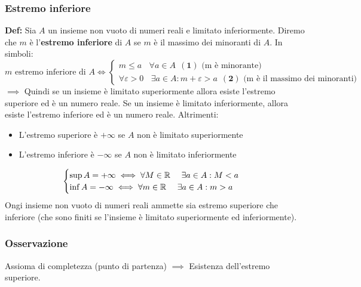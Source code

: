 \documentclass[../../main.tex]{subfiles}
\begin{document}
\subsubsection{Estremo inferiore}
\textbf{Def:} Sia $A$ un insieme non vuoto di numeri reali e limitato inferiormente. Diremo che $m$ è l'\textbf{estremo inferiore} di $A$ se $m$ è il massimo dei minoranti di $A$. In simboli:
\[
    m \text{ estremo inferiore di } A \iff \begin{cases}
        m \leq a  \ \ \ \ \forall a \in A \ \ (\textbf{1}) \text{ (m è minorante)} \\
        \forall \varepsilon > 0 \ \ \ \ \exists a \in A : m + \varepsilon > a \ \ (\textbf{2}) \text{ (m è il massimo dei minoranti)}
    \end{cases}
\]
$\implies$ Quindi se un insieme è limitato superiormente allora esiste l'estremo superiore ed è un numero reale. Se un insieme è limitato inferiormente, allora esiste l'estremo inferiore ed è un numero reale.
Altrimenti:
\begin{itemize}
    \item L'estremo superiore è $+\infty$ se $A$ non è limitato superiormente
    \item L'estremo inferiore è $-\infty$ se $A$ non è limitato inferiormente
\end{itemize}
\[
    \begin{cases}
        \sup A = +\infty \iff \forall M \in \mathbb{R} \ \ \ \ \exists a \in A : M < a \\
        \inf A = -\infty \iff \forall m \in \mathbb{R} \ \ \ \ \exists a \in A : m > a
    \end{cases}
\]
Ongi insieme non vuoto di numeri reali ammette sia estremo superiore che
inferiore (che sono finiti se l'insieme è limitato superiormente ed
inferiormente).

\subsubsection{Osservazione}
Assioma di completezza (punto di partenza) $\implies$ Esistenza dell'estremo
superiore.
\end{document}
